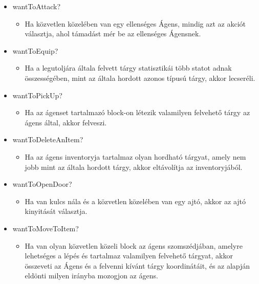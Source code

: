 \begin{itemize}
    \item wantToAttack?
    
    \begin{itemize}
        \item Ha közvetlen közelében van egy ellenséges Ágens, mindig azt az akciót választja, ahol támadást mér be az ellenséges Ágensnek.
    \end{itemize}

    \item wantToEquip?
    
    \begin{itemize}
        \item Ha a legutoljára általa felvett tárgy statisztikái több statot adnak összességében, mint az általa hordott azonos típusú tárgy, akkor lecseréli.
    \end{itemize}

    \item wantToPickUp?
    
    \begin{itemize}
        \item Ha az ágenset tartalmazó block-on létezik valamilyen felvehető tárgy az ágens által, akkor felveszi.
    \end{itemize}

    \item wantToDeleteAnItem?
    
    \begin{itemize}
        \item Ha az ágens inventoryja tartalmaz olyan hordható tárgyat, amely nem jobb mint az általa hordott tárgy, akkor eltávolítja az inventoryjából.
    \end{itemize}

    \item wantToOpenDoor?
    
    \begin{itemize}
        \item Ha van kulcs nála és a közvetlen közelében van egy ajtó, akkor az ajtó kinyitását választja.
    \end{itemize}

    \item wantToMoveToItem?
    
    \begin{itemize}
        \item Ha van olyan közvetlen közeli block az ágens szomszédjában, amelyre lehetséges a lépés és tartalmaz valamilyen felvehető tárgyat,
            akkor összeveti az Ágens és a felvenni kívánt tárgy koordinátáit, és az alapján eldönti milyen irányba mozogjon az ágens. 
    \end{itemize}


\end{itemize}
